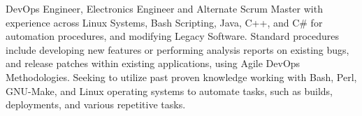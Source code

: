 %
%
%
\vspace*{-.35cm}
\textbf{}
\small{ DevOps Engineer, Electronics Engineer and Alternate Scrum Master with experience across Linux Systems, Bash Scripting, Java, C++, and C\# for automation procedures, and modifying Legacy Software. Standard procedures include developing new features or performing analysis reports on existing bugs, and release patches within existing applications, using Agile DevOps Methodologies. Seeking to utilize past proven knowledge working with Bash, Perl, GNU-Make, and  Linux operating systems to automate tasks, such as builds, deployments, and various repetitive tasks.  
}
